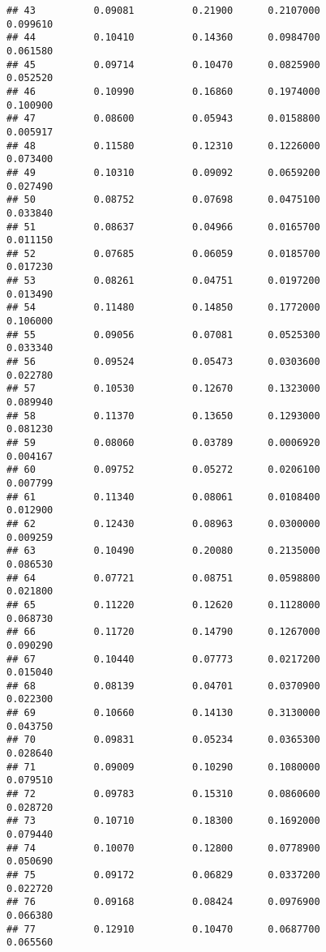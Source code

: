 \documentclass[
]{article}
\begin{document}
\begin{verbatim}
## 43          0.09081          0.21900      0.2107000            0.099610
## 44          0.10410          0.14360      0.0984700            0.061580
## 45          0.09714          0.10470      0.0825900            0.052520
## 46          0.10990          0.16860      0.1974000            0.100900
## 47          0.08600          0.05943      0.0158800            0.005917
## 48          0.11580          0.12310      0.1226000            0.073400
## 49          0.10310          0.09092      0.0659200            0.027490
## 50          0.08752          0.07698      0.0475100            0.033840
## 51          0.08637          0.04966      0.0165700            0.011150
## 52          0.07685          0.06059      0.0185700            0.017230
## 53          0.08261          0.04751      0.0197200            0.013490
## 54          0.11480          0.14850      0.1772000            0.106000
## 55          0.09056          0.07081      0.0525300            0.033340
## 56          0.09524          0.05473      0.0303600            0.022780
## 57          0.10530          0.12670      0.1323000            0.089940
## 58          0.11370          0.13650      0.1293000            0.081230
## 59          0.08060          0.03789      0.0006920            0.004167
## 60          0.09752          0.05272      0.0206100            0.007799
## 61          0.11340          0.08061      0.0108400            0.012900
## 62          0.12430          0.08963      0.0300000            0.009259
## 63          0.10490          0.20080      0.2135000            0.086530
## 64          0.07721          0.08751      0.0598800            0.021800
## 65          0.11220          0.12620      0.1128000            0.068730
## 66          0.11720          0.14790      0.1267000            0.090290
## 67          0.10440          0.07773      0.0217200            0.015040
## 68          0.08139          0.04701      0.0370900            0.022300
## 69          0.10660          0.14130      0.3130000            0.043750
## 70          0.09831          0.05234      0.0365300            0.028640
## 71          0.09009          0.10290      0.1080000            0.079510
## 72          0.09783          0.15310      0.0860600            0.028720
## 73          0.10710          0.18300      0.1692000            0.079440
## 74          0.10070          0.12800      0.0778900            0.050690
## 75          0.09172          0.06829      0.0337200            0.022720
## 76          0.09168          0.08424      0.0976900            0.066380
## 77          0.12910          0.10470      0.0687700            0.065560

\end{verbatim}
\end{document}
